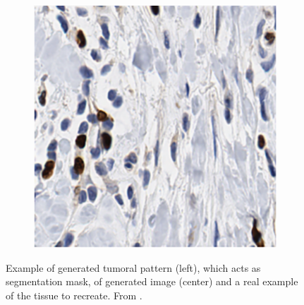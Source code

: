 \begin{figure}[ht]
\begin{subfigure}[t]{0.3\textwidth}
             \caption{}
             \label{fig:cgan_model}
        \end{subfigure}
        \quad
        \begin{subfigure}[t]{0.3\textwidth}
             \centering
             \includegraphics[width = \textwidth]{images/cgan_real}
             \caption{}
             \label{fig:cgan_real}
        \end{subfigure}
        \caption{Example of generated tumoral pattern (left), which acts as segmentation mask, of generated image (center) and a real example of the tissue to recreate. From \cite{Senaras2018}.}
        \label{fig:cgan_tripl}
    \end{figure}
